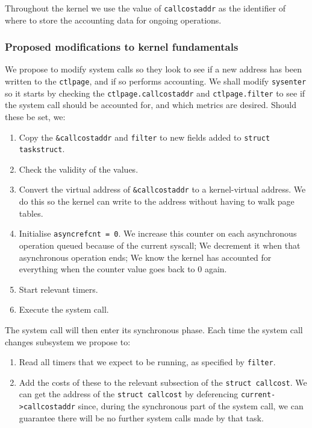 \documentclass[12pt]{article}
\def\_{\textunderscore\-}
\begin{document}
Throughout the kernel we use the value of \texttt{call\_cost\_addr} as the identifier of where to store the accounting data for ongoing operations.

  \subsubsection{Proposed modifications to kernel fundamentals}

We propose to modify system calls  so they look to see if a new address has been written to the \texttt{ctl\_page}, and if so performs accounting.
 We shall modify \texttt{sysenter} so it starts by checking the \texttt{ctl\_page.call\_cost\_addr} and \texttt{ctl\_page.filter} to see if the system call should be accounted for, and which metrics are desired. Should these be set, we:
  \begin{enumerate}
  \item Copy the \texttt{\&call\_cost\_addr} and \texttt{filter} to new fields added to \texttt{struct task\_struct}.
  \item Check the validity of the values.
  \item Convert the virtual address of \texttt{\&call\_cost\_addr} to a kernel-virtual address. We do this so the kernel can write to the address without having to walk page tables.
  \item Initialise \texttt{async\_ref\_cnt = 0}. We increase this counter on each asynchronous operation queued because of the current syscall; We decrement it when that asynchronous operation ends; We know the kernel has accounted for everything when the counter value goes back to 0 again.
  \item Start relevant timers.
  \item Execute the system call.
  \end{enumerate}

  The system call will then enter its synchronous phase. Each time the system call changes subsystem we propose to:
  \begin{enumerate}
  \item Read all timers that we expect to be running, as specified by \texttt{filter}.
  \item Add the costs of these to the relevant subsection of the \texttt{struct call\_cost}. We can get the address of the \texttt{struct call\_cost} by deferencing \texttt{current->call\_cost\_addr} since, during the synchronous part of the system call, we can guarantee there will be no further system calls made by that task.
  \end{enumerate}
\end{document}
